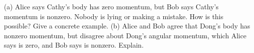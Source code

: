(a) Alice says Cathy's body has zero momentum, but Bob says Cathy's momentum is nonzero.
Nobody is lying or making a mistake. How is this possible? Give a concrete example.\hwendpart
(b) Alice and Bob agree that Dong's body has nonzero momentum, but disagree about Dong's
angular momentum, which Alice says is zero, and Bob says is nonzero. Explain.
